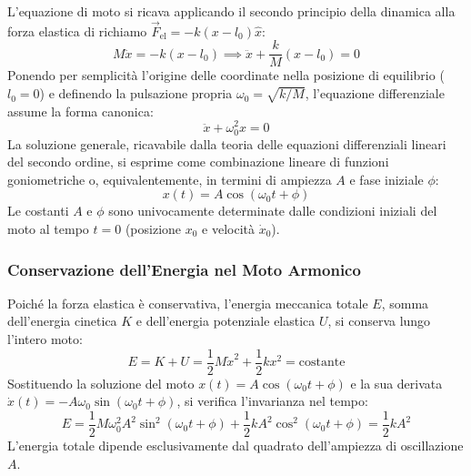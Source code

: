 L'equazione di moto si ricava applicando il secondo principio della dinamica alla forza elastica di richiamo $\vec{F}_{\text{el}} = -k(x - l_0)\hat{x}$:
\begin{equation}
    M\ddot{x} = -k(x - l_0) \implies \ddot{x} + \frac{k}{M}(x - l_0) = 0
\end{equation}
Ponendo per semplicità l'origine delle coordinate nella posizione di equilibrio ($l_0 = 0$) e definendo la pulsazione propria $\omega_0 = \sqrt{k/M}$, l'equazione differenziale assume la forma canonica:
\begin{equation}
    \ddot{x} + \omega_0^2 x = 0
\end{equation}
La soluzione generale, ricavabile dalla teoria delle equazioni differenziali lineari del secondo ordine, si esprime come combinazione lineare di funzioni goniometriche o, equivalentemente, in termini di ampiezza $A$ e fase iniziale $\phi$:
\begin{equation}
    x(t) = A\cos(\omega_0 t + \phi)
\end{equation}
Le costanti $A$ e $\phi$ sono univocamente determinate dalle condizioni iniziali del moto al tempo $t = 0$ (posizione $x_0$ e velocità $\dot{x}_0$).

\subsubsection*{Conservazione dell'Energia nel Moto Armonico}
Poiché la forza elastica è conservativa, l'energia meccanica totale $E$, somma dell'energia cinetica $K$ e dell'energia potenziale elastica $U$, si conserva lungo l'intero moto:
\begin{equation}
    E = K + U = \frac{1}{2}M\dot{x}^2 + \frac{1}{2}kx^2 = \text{costante}
\end{equation}
Sostituendo la soluzione del moto $x(t) = A\cos(\omega_0 t + \phi)$ e la sua derivata $\dot{x}(t) = -A\omega_0\sin(\omega_0 t + \phi)$, si verifica l'invarianza nel tempo:
\begin{equation}
    E = \frac{1}{2}M\omega_0^2 A^2 \sin^2(\omega_0 t + \phi) + \frac{1}{2}kA^2 \cos^2(\omega_0 t + \phi) = \frac{1}{2}kA^2
\end{equation}
L'energia totale dipende esclusivamente dal quadrato dell'ampiezza di oscillazione $A$.

